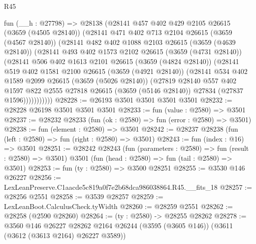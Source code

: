 \begin{lexlean}{R45}
\begin{coremodule}
      fun (__h : @27798) =>
      @28138
        (@28141
          @457
          @402
          @429
          @2105
          @26615
          (@3659 (@4505 @28140))
          (@28141
            @471
            @402
            @713
            @2104
            @26615
            (@3659 (@4567 @28140))
            (@28141
              @482
              @402
              @1088
              @2103
              @26615
              (@3659 (@4639 @28140))
              (@28141
                @493
                @402
                @1573
                @2102
                @26615
                (@3659 (@4731 @28140))
                (@28141
                  @506
                  @402
                  @1613
                  @2101
                  @26615
                  (@3659 (@4824 @28140))
                  (@28141
                    @519
                    @402
                    @1581
                    @2100
                    @26615
                    (@3659 (@4921 @28140))
                    (@28141
                      @534
                      @402
                      @1589
                      @2099
                      @26615
                      (@3659 (@5026 @28140))
                      (@27819
                        @28140
                        @557
                        @402
                        @1597
                        @822
                        @2555
                        @27818
                        @26615
                        (@3659 (@5146 @28140))
                        @27834
                        (@27837 @1596)))))))))))
@28228 := @26193 @3501 @3501 @3501 @3501
@28232 := @28228 @26198 @3501 @3501 @3501
@28233 := fun (value : @2580) => @3501
@28237 := @28232 @28233 (fun (ok : @2580) => fun (error : @2580) => @3501)
@28238 := fun (element : @2580) => @3501
@28242 := @28237 @28238 (fun (left : @2580) => fun (right : @2580) => @3501)
@28243 := fun (index : @16) => @3501
@28251 := @28242
    @28243
    (fun (parameters : @2580) => fun (result : @2580) => @3501)
    @3501
    (fun (head : @2580) => fun (tail : @2580) => @3501)
@28253 := fun (ty : @2580) => @3500 @28251
@28255 := @3530 @146 @26227
@28256 := LexLeanPreserve.C1aacde5c819a0f7e2b68dca986038864.R45.__fits_18
@28257 := @28256 @2551
@28258 := @3539 @28257
@28259 := LexLeanBoot.CalculusCheck.tyWidth
@28260 := @28259 @2551
@28262 := @28258 (@2590 @28260)
@28264 := (ty : @2580) -> @28255 @28262
@28278 := @3560
    @146
    @26227
    @28262
    @2164
    @26244
    (@3595 (@3605 @146))
    (@3611 (@3612 (@3613 @2164) @26227 @3589))

\end{coremodule}
\end{lexlean}
